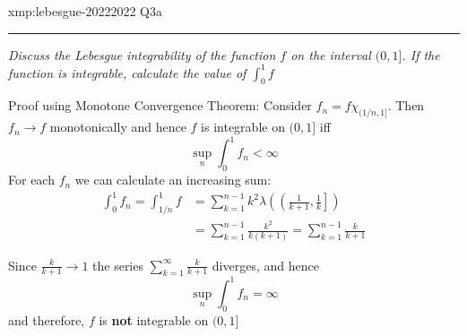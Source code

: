 \documentclass[landscape, 8pt]{extarticle}
\begin{document}
\begin{multicols}{3}
\begin{xmp}{xmp:lebesgue-2022}{2022 Q3a}
	\noindent\rule{\textwidth}{0.2pt}
	\textit{Discuss the Lebesgue integrability of the function $f$ on the interval $(0, 1]$. If the function is integrable, calculate the value of $\int_{0}^{1} f$}

	Proof using Monotone Convergence Theorem: Consider $f_{n} = f \chi_{(1 /n, 1]}$. Then $f_{n}\to f$ monotonically and hence $f$ is integrable on $(0, 1]$ iff
	\[\sup_{n} \int_{0}^{1} f_{n} < \infty\]
	For each $f_{n}$ we can calculate an increasing sum:
	\begin{align*}
		\int_{0}^{1} f_{n} = \int_{1 /n}^{1} f &= \sum_{k = 1}^{n - 1} k^{2} \lambda \left(\left(\frac{1}{k+1}, \frac{1}{k}\right]\right) \\
											   &= \sum_{k = 1}^{n - 1} \frac{k^{2}}{k(k+1)} =\sum_{k = 1}^{n - 1} \frac{k}{k+1} 
	\end{align*}

	Since $\frac{k}{k + 1} \to 1$ the series $\sum_{k = 1}^{\infty} \frac{k}{k+1}$ diverges, and hence
	\[\sup_{n} \int_{0}^{1} f_{n} = \infty\]
	and therefore, $f$ is \textbf{not} integrable on $(0, 1]$
\end{xmp}




\end{multicols}
\end{document}
